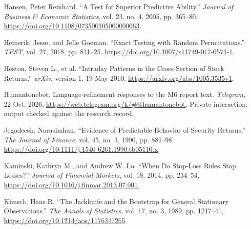 \documentclass[11pt,a4paper]{article}
\begin{document}
{\RaggedRight\hangindent=1.27cm\noindent Hansen, Peter Reinhard. “A Test for Superior Predictive Ability.” \textit{Journal of Business \& Economic Statistics}, vol. 23, no. 4, 2005, pp. 365–80. \url{https://doi.org/10.1198/073500105000000063}.\par}\vspace{5pt}

{\RaggedRight\hangindent=1.27cm\noindent Hemerik, Jesse, and Jelle Goeman. “Exact Testing with Random Permutations.” \textit{TEST}, vol. 27, 2018, pp. 811–25. \url{https://doi.org/10.1007/s11749-017-0571-1}.\par}\vspace{5pt}

{\RaggedRight\hangindent=1.27cm\noindent Heston, Steven L., et al. “Intraday Patterns in the Cross-Section of Stock Returns.” \textit{arXiv}, version 1, 19 May 2010, \url{https://arxiv.org/abs/1005.3535v1}.\par}\vspace{5pt}

{\RaggedRight\hangindent=1.27cm\noindent Humantonebot. Language-refinement responses to the M6 report text. \textit{Telegram}, 22 Oct. 2026, \url{https://web.telegram.org/k/\#@humantonebot}. Private interaction; output checked against the research record.\par}\vspace{5pt}

{\RaggedRight\hangindent=1.27cm\noindent Jegadeesh, Narasimhan. “Evidence of Predictable Behavior of Security Returns.” \textit{The Journal of Finance}, vol. 45, no. 3, 1990, pp. 881–98. \url{https://doi.org/10.1111/j.1540-6261.1990.tb05110.x}.\par}\vspace{5pt}

{\RaggedRight\hangindent=1.27cm\noindent Kaminski, Kathryn M., and Andrew W. Lo. “When Do Stop-Loss Rules Stop Losses?” \textit{Journal of Financial Markets}, vol. 18, 2014, pp. 234--54, \url{https://doi.org/10.1016/j.finmar.2013.07.001}.\par}\vspace{5pt}

{\RaggedRight\hangindent=1.27cm\noindent Künsch, Hans R. “The Jackknife and the Bootstrap for General Stationary Observations.” \textit{The Annals of Statistics}, vol. 17, no. 3, 1989, pp. 1217--41, \url{https://doi.org/10.1214/aos/1176347265}.\par}\vspace{5pt}
\end{document}
